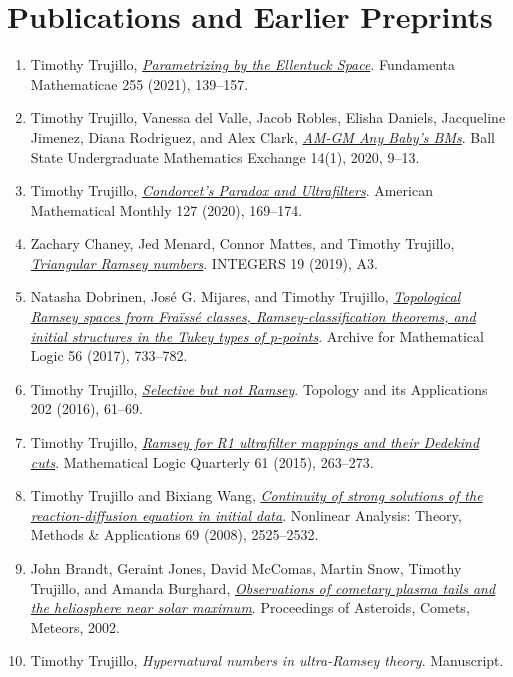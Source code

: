 \documentclass[10pt,letterpaper]{article}
\begin{document}
\section*{Publications and Earlier Preprints}
\begin{enumerate}
\item Timothy Trujillo, \emph{\href{https://www.impan.pl/en/publishing-house/journals-and-series/fundamenta-mathematicae/all/255/2/114223/parametrizing-by-the-ellentuck-space}{Parametrizing by the Ellentuck Space}}. Fundamenta Mathematicae 255 (2021), 139--157.
\item Timothy Trujillo, Vanessa del Valle, Jacob Robles, Elisha Daniels, Jacqueline Jimenez, Diana Rodriguez, and Alex Clark, \emph{\href{https://cardinalscholar.bsu.edu/server/api/core/bitstreams/7cbd9a6b-59eb-421e-9301-e179c98a3b0c/content}{AM-GM Any Baby's BMs}}. Ball State Undergraduate Mathematics Exchange 14(1), 2020, 9--13.
\item Timothy Trujillo, \emph{\href{https://doi.org/10.1080/00029890.2020.1680200}{Condorcet's Paradox and Ultrafilters}}. American Mathematical Monthly 127 (2020), 169--174.
\item Zachary Chaney, Jed Menard, Connor Mattes, and Timothy Trujillo, \emph{\href{https://math.colgate.edu/~integers/t3/t3.pdf}{Triangular Ramsey numbers}}. INTEGERS 19 (2019), A3.
\item Natasha Dobrinen, José G. Mijares, and Timothy Trujillo, \emph{\href{https://doi.org/10.1007/s00153-017-0540-0}{Topological Ramsey spaces from Fraïssé classes, Ramsey-classification theorems, and initial structures in the Tukey types of p-points}}. Archive for Mathematical Logic 56 (2017), 733--782.
\item Timothy Trujillo, \emph{\href{https://doi.org/10.1016/j.topol.2015.12.088}{Selective but not Ramsey}}. Topology and its Applications 202 (2016), 61--69.
\item Timothy Trujillo, \emph{\href{https://doi.org/10.1002/malq.201300078}{Ramsey for R1 ultrafilter mappings and their Dedekind cuts}}. Mathematical Logic Quarterly 61 (2015), 263--273.
\item Timothy Trujillo and Bixiang Wang, \emph{\href{https://doi.org/10.1016/j.na.2007.08.032}{Continuity of strong solutions of the reaction-diffusion equation in initial data}}. Nonlinear Analysis: Theory, Methods \& Applications 69 (2008), 2525--2532.
\item John Brandt, Geraint Jones, David McComas, Martin Snow, Timothy Trujillo, and Amanda Burghard, \emph{\href{https://collaborate.princeton.edu/en/publications/observations-of-cometary-plasma-tails-and-the-heliosphere-near-so}{Observations of cometary plasma tails and the heliosphere near solar maximum}}. Proceedings of Asteroids, Comets, Meteors, 2002.
\item Timothy Trujillo, \emph{Hypernatural numbers in ultra-Ramsey theory}. Manuscript.
\end{enumerate}
\end{document}

